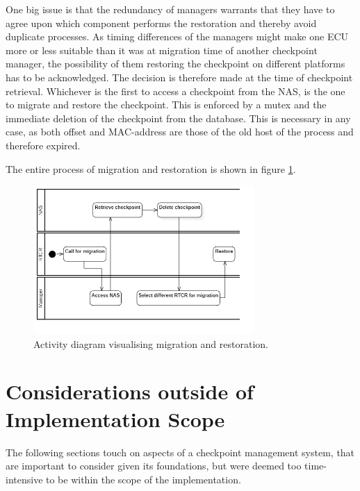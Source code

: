 One big issue is that the redundancy of managers warrants that they have to agree upon which component performs the restoration and thereby avoid duplicate processes. As timing differences of the managers might make one ECU more or less suitable than it was at migration time of another checkpoint manager, the possibility of them restoring the checkpoint on different platforms has to be acknowledged. The decision is therefore made at the time of checkpoint retrieval. Whichever is the first to access a checkpoint from the NAS, is the one to migrate and restore the checkpoint. This is enforced by a mutex and the immediate deletion of the checkpoint from the database. This is necessary in any case, as both offset and MAC-address are those of the old host of the process and therefore expired. 

The entire process of migration and restoration is shown in figure \ref{fig:migr_activity}.
\begin{figure}
    \centering
    \includegraphics[width=0.75\textwidth]{Images/migration-restoration_activity.png}
    \caption{Activity diagram visualising migration and restoration.}
    \label{fig:migr_activity}
\end{figure}
\section{Considerations outside of Implementation Scope}
The following sections touch on aspects of a checkpoint management system, that are important to consider given its foundations, but were deemed too time-intensive to be within the scope of the implementation.
